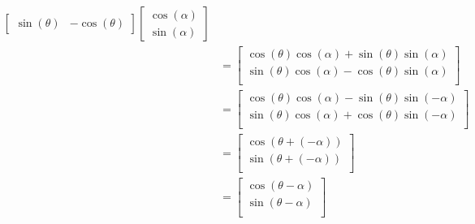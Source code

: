 \documentclass[12pt,letterpaper]{article}
\theoremstyle{definition}
\begin{document}
\begin{align*}
\begin{bmatrix}
                                             \sin(\theta) & -\cos(\theta)
                                           \end{bmatrix}
                                                  \begin{bmatrix}
                                                    \cos(\alpha) \\
                                                    \sin(\alpha)
                                                  \end{bmatrix} \\
                                         &=
                                           \begin{bmatrix}
                                             \cos(\theta) \cos(\alpha) + \sin(\theta) \sin(\alpha) \\
                                             \sin(\theta) \cos(\alpha) - \cos(\theta) \sin(\alpha) \\
                                           \end{bmatrix} \\
                                         &=
                                           \begin{bmatrix}
                                             \cos(\theta) \cos(\alpha) - \sin(\theta) \sin(-\alpha) \\
                                             \sin(\theta) \cos(\alpha) + \cos(\theta) \sin(-\alpha) \\
                                           \end{bmatrix} \\
                                         &=
                                           \begin{bmatrix}
                                             \cos(\theta + (-\alpha)) \\
                                             \sin(\theta + (-\alpha)) \\
                                           \end{bmatrix} \\
                                         &=
                                           \begin{bmatrix}
                                             \cos(\theta - \alpha) \\
                                             \sin(\theta - \alpha) \\
                                           \end{bmatrix} \\
\end{align*}
\end{document}
